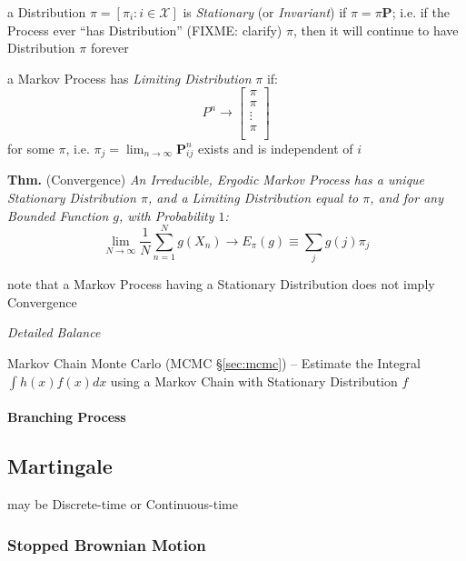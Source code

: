 a Distribution $\pi = [\pi_i : i \in \mathcal{X}]$ is \emph{Stationary} (or
\emph{Invariant}) if $\pi = \pi \mathbf{P}$; i.e. if the Process ever ``has
Distribution'' (FIXME: clarify) $\pi$, then it will continue to have
Distribution $\pi$ forever

a Markov Process has \emph{Limiting Distribution} $\pi$ if:
\[
  P^n \rightarrow \begin{bmatrix}
    \pi \\
    \pi \\
    \vdots \\
    \pi \\
  \end{bmatrix}
\]
for some $\pi$, i.e. $\pi_j = \lim_{n\rightarrow\infty} \mathbf{P}_{ij}^n$
exists and is independent of $i$

\textbf{Thm.} (Convergence) \emph{
  An Irreducible, Ergodic Markov Process has a
  unique Stationary Distribution $\pi$, and a Limiting Distribution equal to
  $\pi$, and for any Bounded Function $g$, with Probability $1$:
\[
  \lim_{N\rightarrow\infty} \frac{1}{N} \sum_{n=1}^N g(X_n)
    \rightarrow E_\pi(g) \equiv \sum_j g(j) \pi_j
\]
}

note that a Markov Process having a Stationary Distribution does not imply
Convergence

\emph{Detailed Balance}

\fist Markov Chain Monte Carlo (MCMC \S\ref{sec:mcmc}) -- Estimate the Integral
$\int h(x) f(x) dx$ using a Markov Chain with Stationary Distribution $f$



\paragraph{Branching Process}\label{sec:branching_process}\hfill



\subsection{Martingale}\label{sec:martingale}

may be Discrete-time or Continuous-time



\subsubsection{Stopped Brownian Motion}\label{sec:stopped_brownian_motion}

